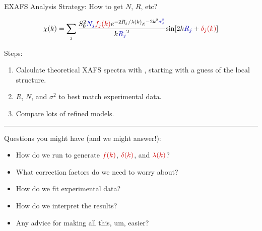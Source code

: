 \begin{slide}{EXAFS Analysis Strategy:  How to get $N$, $R$, etc?}

  \begin{cenpage}{135mm}

      \[
      \chi(k) = \sum_j {{ S_0^2 {\Blue{N_j}} {\Red{f_j(k)}}  e^{-2R_j/\lambda(k)}
          e^{-2k^2{\Blue{\sigma_j^2}}}}\over{k{\Blue{R_j}}^2}}
      {\sin[{2k{\Blue{R_j}} + {\Red{\delta_j(k)}}} ]}
      \]

   \vmm
   Steps:
   \begin{enumerate}
   \item Calculate theoretical XAFS spectra  with {\feff},  starting with a guess of the local structure.
   \item  {} $R$, $N$, and $\sigma^2$  to best match  experimental data.
   \item Compare lots of refined models.
   \end{enumerate}

\vmm \vmm \hrule \vmm\vmm

 Questions you might have (and we might answer!):

  \begin{itemize}
  \item How do we run {\feff} to generate $\Red{f(k)}$, $\Red{\delta(k)}$,
    and  $\Red{\lambda(k)}$?
  \item What correction factors do we need to worry about?
  \item How do we fit experimental data?
  \item How do we interpret the results?
  \item Any advice for making all this, um, easier?
  \end{itemize}

\vfill
\end{cenpage}  \end{slide}



